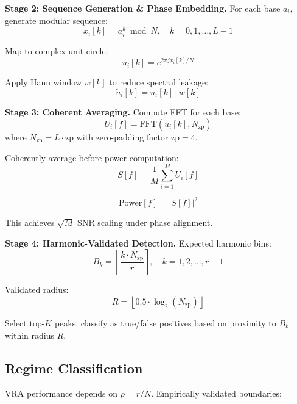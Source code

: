 \documentclass[conference]{IEEEtran}
\begin{document}
\textbf{Stage 2: Sequence Generation \& Phase Embedding.} For each base $a_i$, generate modular sequence:
\begin{equation}
x_i[k] = a_i^k \bmod N, \quad k = 0, 1, \ldots, L-1
\end{equation}

Map to complex unit circle:
\begin{equation}
u_i[k] = e^{2\pi j x_i[k] / N}
\end{equation}

Apply Hann window $w[k]$ to reduce spectral leakage:
\begin{equation}
\tilde{u}_i[k] = u_i[k] \cdot w[k]
\end{equation}

\textbf{Stage 3: Coherent Averaging.} Compute FFT for each base:
\begin{equation}
U_i[f] = \text{FFT}(\tilde{u}_i[k], N_{\text{zp}})
\end{equation}
where $N_{\text{zp}} = L \cdot \text{zp}$ with zero-padding factor $\text{zp} = 4$.

Coherently average before power computation:
\begin{equation}
S[f] = \frac{1}{M} \sum_{i=1}^M U_i[f]
\end{equation}

\begin{equation}
\text{Power}[f] = |S[f]|^2
\end{equation}

This achieves $\sqrt{M}$ SNR scaling under phase alignment.

\textbf{Stage 4: Harmonic-Validated Detection.} Expected harmonic bins:
\begin{equation}
B_k = \left\lfloor \frac{k \cdot N_{\text{zp}}}{r} \right\rceil, \quad k = 1, 2, \ldots, r-1
\end{equation}

Validated radius:
\begin{equation}
R = \left\lfloor 0.5 \cdot \log_2(N_{\text{zp}}) \right\rfloor
\end{equation}

Select top-$K$ peaks, classify as true/false positives based on proximity to $B_k$ within radius $R$.

\subsection{Regime Classification}

VRA performance depends on $\rho = r/N$. Empirically validated boundaries:
\end{document}
